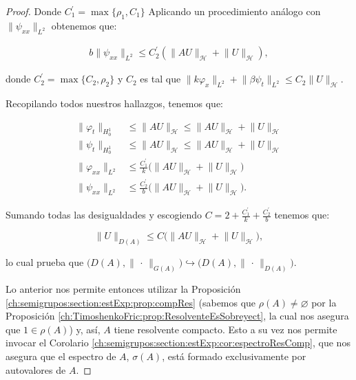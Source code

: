 \begin{proof}
    Donde $C_1^\prime = \max\{\rho_1, C_1\}$ Aplicando un procedimiento análogo con $\lVert \psi_{xx} \rVert_{L^2}$ obtenemos que:

    \begin{align*}
        b\lVert \psi_{xx} \rVert_{L^2} \leq C^\prime_2(\lVert AU \rVert_{\mathcal{H}} + \lVert U \rVert_{\mathcal{H}}),   
    \end{align*}

    donde $C_2^\prime = \max\{C_2, \rho_2\}$ y $C_2$ es tal que $\lVert k \varphi_x \rVert_{L^2} + \lVert \beta \psi_t \rVert_{L^2} \leq C_2 \lVert U \rVert_{\mathcal{H}}$.

    Recopilando todos nuestros hallazgos, tenemos que:

    \begin{align*}
        \lVert \varphi_t \rVert_{H_0^1} &\leq \lVert AU \rVert_{\mathcal{H}} \leq \lVert AU \rVert_{\mathcal{H}} + \lVert U \rVert_{\mathcal{H}}\\
        \lVert \psi_t \rVert_{H_0^1} &\leq \lVert AU \rVert_{\mathcal{H}} \leq \lVert AU \rVert_{\mathcal{H}} + \lVert U \rVert_{\mathcal{H}}\\
        \lVert \varphi_{xx} \rVert_{L^2} &\leq \frac{C_1^\prime}{k}\big(\lVert AU \rVert_{\mathcal{H}} + \lVert U \rVert_{\mathcal{H}}\big)\\
        \lVert \psi_{xx} \rVert_{L^2} &\leq \frac{C_2^\prime}{b}\big(\lVert AU \rVert_{\mathcal{H}} + \lVert U \rVert_{\mathcal{H}}\big).
    \end{align*}

    Sumando todas las desigualdades y escogiendo $C = 2 + \frac{C_1^\prime}{k} + \frac{C_2^\prime}{b}$ tenemos que:

    \[\lVert U \rVert_{D(A)} \leq C \big(\lVert AU \rVert_{\mathcal{H}} + \lVert U \rVert_{\mathcal{H}}\big),\]

    lo cual prueba que $\big(D(A), \lVert \, \cdot \, \rVert_{G(A)}\big) {\hookrightarrow} \big(D(A), \lVert \, \cdot \, \rVert_{D(A)}\big)$. 
    
    Lo anterior nos permite entonces utilizar la Proposición \ref{ch:semigrupos:section:estExp:prop:compRes} (sabemos que $\rho(A) \neq \varnothing$ por la Proposición \ref{ch:TimoshenkoFric:prop:ResolventeEsSobreyect}, la cual nos asegura que $1 \in \rho(A)$) y, así, $A$ tiene resolvente compacto. Esto a su vez nos permite invocar el Corolario \ref{ch:semigrupos:section:estExp:cor:espectroResComp}, que nos asegura que el espectro de $A$, $\sigma(A)$, está formado exclusivamente por autovalores de $A$.


\end{proof}
